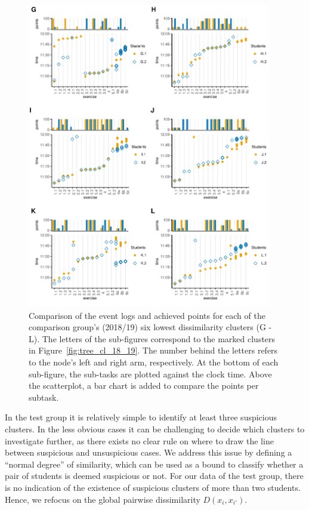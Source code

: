 \documentclass{edm_article}
\begin{document}
\begin{figure}
	\begin{center}
		\includegraphics[width = 0.95\textwidth]{cowplot_comp_6_18_19.pdf}
		\caption{Comparison of the event logs and achieved points for each of the comparison group's (2018/19) six lowest dissimilarity clusters (G - L). The letters of the sub-figures correspond to the marked clusters in Figure~\ref{fig:tree_cl_18_19}. The number behind the letters refers to the node's left and right arm, respectively. At the bottom of each sub-figure, the sub-tasks are plotted against the clock time. Above the scatterplot, a bar chart is added to compare the points per subtask.}
		\label{fig:comp_stud_18_19}
	\end{center}
\end{figure}

In the test group it is relatively simple to identify at least three suspicious clusters. In the less obvious cases it can be challenging to decide which clusters to investigate further, as there exists no clear rule on where to draw the line between suspicious and unsuspicious cases. We address this issue by defining a ``normal degree'' of similarity, which can be used as a bound to classify whether a pair of students is deemed suspicious or not. For our data of the test group, there is no indication of the existence of suspicious clusters of more than two students. Hence, we refocus on the global pairwise dissimilarity $D(x_i, x_{i'})$. 
\end{document}

